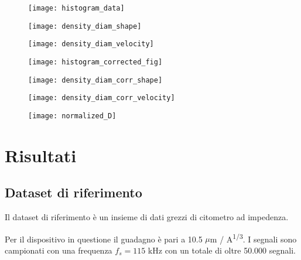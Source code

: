 \begin{figure*}[t!]
	\centering
		\begin{subfigure}{0.33\linewidth}
		\centering
		\texttt{[image: histogram\_data]}
		\caption{}
	\end{subfigure}\hfill
	\begin{subfigure}{0.33\linewidth}
		\centering
		\texttt{[image: density\_diam\_shape]}
		\caption{}
	\end{subfigure}\hfill
	\begin{subfigure}{0.33\linewidth}
		\centering
		\texttt{[image: density\_diam\_velocity]}
		\caption{}
	\end{subfigure}\hfill
	\begin{subfigure}{0.33\linewidth}
	\centering
	\texttt{[image: histogram\_corrected\_fig]}
	\caption{}
\end{subfigure}\hfill
	\begin{subfigure}{0.33\linewidth}
	\centering
	\texttt{[image: density\_diam\_corr\_shape]}
	\caption{}
\end{subfigure}\hfill
\begin{subfigure}{0.33\linewidth}
	\centering
	\texttt{[image: density\_diam\_corr\_velocity]}
	\caption{}
\end{subfigure}
	\caption{}
	\label{fig:density}
\end{figure*}

\begin{figure}[t!]
	\centering
	\texttt{[image: normalized\_D]}
	\caption{}
	\label{fig:normalizedDensity}
\end{figure}

\section{Risultati}

\subsection{Dataset di riferimento}

Il dataset di riferimento è un insieme di dati grezzi di citometro ad impedenza.  

Per il dispositivo in questione il guadagno è pari a 10.5 $\mu$m / A\textsuperscript{1/3}. I segnali sono campionati con una frequenza $f_s=115$ kHz con un totale di oltre 50.000 segnali.


